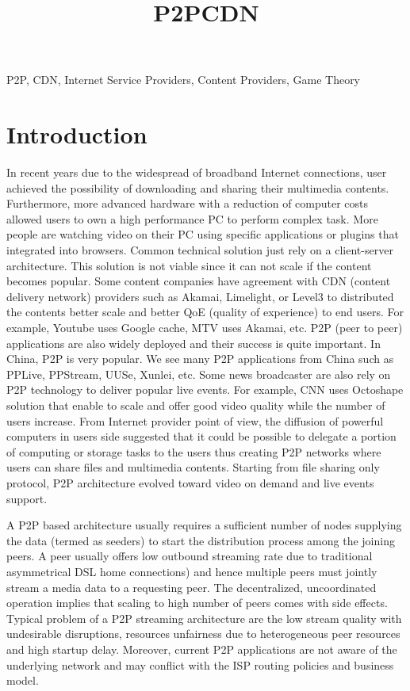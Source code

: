 \documentclass[paper]{ieice}
\title{P2PCDN}
\begin{document}
\maketitle

\begin{summary}
\end{summary}
\begin{keywords}
P2P, CDN, Internet Service Providers, Content Providers, Game Theory 
\end{keywords}  

\section{Introduction}\label{intro}
In recent years due to the widespread of broadband Internet connections, user achieved the possibility of downloading and sharing their multimedia contents.
Furthermore, more advanced hardware with a reduction of computer costs allowed users to own a high performance PC to perform complex task.
More people are watching video on their PC using specific applications or plugins that integrated into browsers.
Common technical solution just rely on a client-server architecture.
This solution is not viable since it can not scale if the content becomes popular.
Some content companies have agreement with CDN (content delivery network) providers such as Akamai, Limelight, or Level3 to distributed the contents better scale and better QoE (quality of experience) to end users.
For example, Youtube uses Google cache, MTV uses Akamai, etc. P2P (peer to peer) applications are also widely deployed and their success is quite important. 
In China, P2P is very popular. 
We see many P2P applications from China such as PPLive, PPStream, UUSe, Xunlei, etc.  
Some news broadcaster are also rely on P2P technology to deliver popular live events.
For example, CNN uses Octoshape solution that enable to scale and offer good video quality while the number of users increase.
From Internet provider point of view, the diffusion of powerful computers in users side suggested that it could be possible to delegate a portion of computing or storage tasks to the users thus creating P2P networks where users can share files and multimedia contents.
Starting from file sharing only protocol, P2P architecture evolved toward video on demand and live events support. 

A P2P based architecture usually requires a sufficient number of nodes supplying the data (termed as seeders) to start the distribution process among the joining peers.
A peer usually offers low outbound streaming rate due to traditional asymmetrical DSL home connections) and hence multiple peers must jointly stream a media data to a requesting peer. 
The decentralized, uncoordinated operation implies that scaling to high number of peers comes with side effects.
Typical problem of a P2P streaming architecture are the low stream quality with undesirable disruptions, resources unfairness due to heterogeneous peer resources and high startup delay.
Moreover, current P2P applications are not aware of the underlying network and may conflict with the ISP routing policies and business model.
\end{document}
